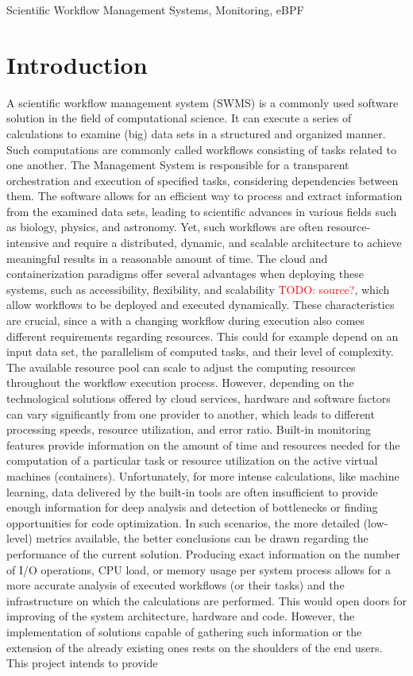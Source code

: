 \documentclass[lettersize,journal]{IEEEtran}
\newcommand{\todo}[1]{\textcolor{red}{TODO: #1}\PackageWarning{TODO:}{#1!}}
\begin{document}
	\begin{IEEEkeywords}
		Scientific Workflow Management Systems, Monitoring, eBPF
	\end{IEEEkeywords}
	
	\section{Introduction}
	A scientific workflow management system (SWMS) is a commonly used software solution in the field of computational science. It can execute a series of calculations to examine (big) data sets in a structured and organized manner. Such computations are commonly called workflows consisting of tasks related to one another. The Management System is responsible for a transparent orchestration and execution of specified tasks, considering dependencies between them. The software allows for an efficient way to process and extract information from the examined data sets, leading to scientific advances in various fields such as biology, physics, and astronomy\cite{gil2007examiningchallengesscientific}. Yet, such workflows are often resource-intensive and require a distributed, dynamic, and scalable architecture to achieve meaningful results in a reasonable amount of time. The cloud and containerization paradigms offer several advantages when deploying these systems, such as accessibility, flexibility, and scalability \todo{source?}, which allow workflows to be deployed and executed dynamically. These characteristics are crucial, since a with a changing workflow during execution also comes different requirements regarding resources. This could for example depend on an input data set, the parallelism of computed tasks, and their level of complexity. The available resource pool can scale to adjust the computing resources throughout the workflow execution process. However, depending on the technological solutions offered by cloud services, hardware and software factors can vary significantly from one provider to another, which leads to different processing speeds, resource utilization, and error ratio\cite{aljamal2018comparativereviewhighperformance}. Built-in monitoring features provide information on the amount of time and resources needed for the computation of a particular task or resource utilization on the active virtual machines (containers). Unfortunately, for more intense calculations, like machine learning, data delivered by the built-in tools are often insufficient to provide enough information for deep analysis and detection of bottlenecks or finding opportunities for code optimization. In such scenarios, the more detailed (low-level) metrics available, the better conclusions can be drawn regarding the performance of the current solution. Producing exact information on the number of I/O operations, CPU load, or memory usage per system process allows for a more accurate analysis of executed workflows (or their tasks) and the infrastructure on which the calculations are performed. This would open doors for improving of the system architecture, hardware and code. However, the implementation of solutions capable of gathering such information or the extension of the already existing ones rests on the shoulders of the end users. This project intends to provide 
\end{document}
